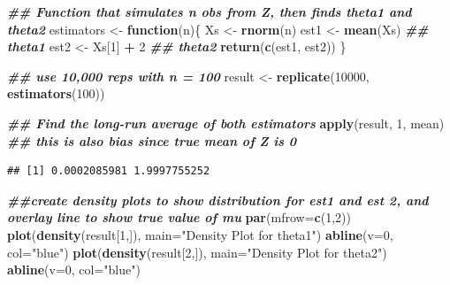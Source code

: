 \documentclass[
]{book}
\newenvironment{Shaded}{\begin{snugshade}}{\end{snugshade}}
\newcommand{\AttributeTok}[1]{\textcolor[rgb]{0.13,0.29,0.53}{#1}}
\newcommand{\ControlFlowTok}[1]{\textcolor[rgb]{0.13,0.29,0.53}{\textbf{#1}}}
\newcommand{\DecValTok}[1]{\textcolor[rgb]{0.00,0.00,0.81}{#1}}
\newcommand{\DocumentationTok}[1]{\textcolor[rgb]{0.56,0.35,0.01}{\textbf{\textit{#1}}}}
\newcommand{\FunctionTok}[1]{\textcolor[rgb]{0.13,0.29,0.53}{\textbf{#1}}}
\newcommand{\NormalTok}[1]{#1}
\newcommand{\OtherTok}[1]{\textcolor[rgb]{0.56,0.35,0.01}{#1}}
\newcommand{\SpecialCharTok}[1]{\textcolor[rgb]{0.81,0.36,0.00}{\textbf{#1}}}
\newcommand{\StringTok}[1]{\textcolor[rgb]{0.31,0.60,0.02}{#1}}
\theoremstyle{definition}
\theoremstyle{definition}
\theoremstyle{definition}
\theoremstyle{definition}
\theoremstyle{remark}
\begin{document}
\begin{Shaded}
\begin{Highlighting}[]
\DocumentationTok{\#\# Function that simulates n obs from Z, then finds theta1 and theta2}
\NormalTok{estimators }\OtherTok{\textless{}{-}} \ControlFlowTok{function}\NormalTok{(n)\{}
\NormalTok{  Xs }\OtherTok{\textless{}{-}} \FunctionTok{rnorm}\NormalTok{(n)}
\NormalTok{  est1 }\OtherTok{\textless{}{-}} \FunctionTok{mean}\NormalTok{(Xs) }\DocumentationTok{\#\# theta1}
\NormalTok{  est2 }\OtherTok{\textless{}{-}}\NormalTok{ Xs[}\DecValTok{1}\NormalTok{] }\SpecialCharTok{+} \DecValTok{2} \DocumentationTok{\#\# theta2}
  \FunctionTok{return}\NormalTok{(}\FunctionTok{c}\NormalTok{(est1, est2))}
\NormalTok{\}}

\DocumentationTok{\#\# use 10,000 reps with n = 100}
\NormalTok{result }\OtherTok{\textless{}{-}} \FunctionTok{replicate}\NormalTok{(}\DecValTok{10000}\NormalTok{, }\FunctionTok{estimators}\NormalTok{(}\DecValTok{100}\NormalTok{))}

\DocumentationTok{\#\# Find the long{-}run average of both estimators}
\FunctionTok{apply}\NormalTok{(result, }\DecValTok{1}\NormalTok{, mean) }\DocumentationTok{\#\# this is also bias since true mean of Z is 0}
\end{Highlighting}
\end{Shaded}

\begin{verbatim}
## [1] 0.0002085981 1.9997755252
\end{verbatim}

\begin{Shaded}
\begin{Highlighting}[]
\DocumentationTok{\#\#create density plots to show distribution for est1 and est 2, and overlay line to show true value of mu}
\FunctionTok{par}\NormalTok{(}\AttributeTok{mfrow=}\FunctionTok{c}\NormalTok{(}\DecValTok{1}\NormalTok{,}\DecValTok{2}\NormalTok{))}
\FunctionTok{plot}\NormalTok{(}\FunctionTok{density}\NormalTok{(result[}\DecValTok{1}\NormalTok{,]), }\AttributeTok{main=}\StringTok{"Density Plot for theta1"}\NormalTok{)}
\FunctionTok{abline}\NormalTok{(}\AttributeTok{v=}\DecValTok{0}\NormalTok{, }\AttributeTok{col=}\StringTok{"blue"}\NormalTok{)}
\FunctionTok{plot}\NormalTok{(}\FunctionTok{density}\NormalTok{(result[}\DecValTok{2}\NormalTok{,]), }\AttributeTok{main=}\StringTok{"Density Plot for theta2"}\NormalTok{)}
\FunctionTok{abline}\NormalTok{(}\AttributeTok{v=}\DecValTok{0}\NormalTok{, }\AttributeTok{col=}\StringTok{"blue"}\NormalTok{)}
\end{Highlighting}
\end{Shaded}
\end{document}
